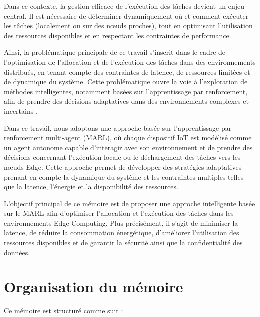 \documentclass[12pt,a4paper]{report}
\begin{document}
Dans ce contexte, la gestion efficace de l’exécution des tâches devient un enjeu central. Il est nécessaire de déterminer dynamiquement où et comment exécuter les tâches (localement ou sur des nœuds proches), tout en optimisant l’utilisation des ressources disponibles et en respectant les contraintes de performance.

Ainsi, la problématique principale de ce travail s’inscrit dans le cadre de l’optimisation de l’allocation et de l’exécution des tâches dans des environnements distribués, en tenant compte des contraintes de latence, de ressources limitées et de dynamique du système. Cette problématique ouvre la voie à l’exploration de méthodes intelligentes, notamment basées sur l’apprentissage par renforcement, afin de prendre des décisions adaptatives dans des environnements complexes et incertains \cite{baccour2024}.

Dans ce travail, nous adoptons une approche basée sur l’apprentissage par renforcement multi-agent (MARL), où chaque dispositif IoT est modélisé comme un agent autonome capable d’interagir avec son environnement et de prendre des décisions concernant l’exécution locale ou le déchargement des tâches vers les nœuds Edge. Cette approche permet de développer des stratégies adaptatives prenant en compte la dynamique du système et les contraintes multiples telles que la latence, l’énergie et la disponibilité des ressources.

L’objectif principal de ce mémoire est de proposer une approche intelligente basée sur le MARL afin d’optimiser l’allocation et l’exécution des tâches dans les environnements Edge Computing. Plus précisément, il s’agit de minimiser la latence, de réduire la consommation énergétique, d’améliorer l’utilisation des ressources disponibles et de garantir la sécurité ainsi que la confidentialité des données.

\section*{Organisation du mémoire}

Ce mémoire est structuré comme suit :
\end{document}
